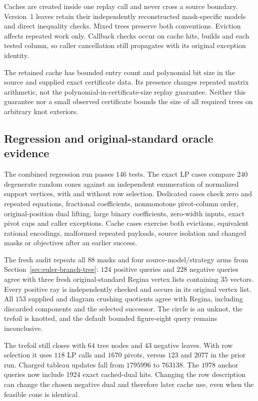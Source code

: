 Caches are created inside one replay call and never cross a source boundary.
Version~1 leaves retain their independently reconstructed mask-specific
models and direct inequality checks.  Mixed trees preserve both conventions.
Eviction affects repeated work only.  Callback checks occur on cache hits,
builds and each tested column, so caller cancellation still propagates with
its original exception identity.

The retained cache has bounded entry count and polynomial bit size in the
source and supplied exact certificate data.  Its presence changes repeated
matrix arithmetic, not the polynomial-in-certificate-size replay guarantee.
Neither this guarantee nor a small observed certificate bounds the size of
all required trees on arbitrary knot exteriors.

\subsection{Regression and original-standard oracle evidence}

The combined regression run passes $146$ tests.  The exact LP cases compare
$240$ degenerate random cones against an independent enumeration of normalized
support vertices, with and without row selection.  Dedicated cases check
zero and repeated equations, fractional coefficients, nonmonotone pivot-column
order, original-position dual lifting, large binary coefficients, zero-width
inputs, exact pivot caps and caller exceptions.  Cache cases exercise both
evictions, equivalent rational encodings, malformed repeated payloads,
source isolation and changed masks or objectives after an earlier success.

The fresh audit repeats all $88$ masks and four source-model/strategy arms
from Section~\ref{sec:euler-branch-tree}: $124$ positive queries and $228$
negative queries agree with three fresh original-standard Regina vertex
lists containing $35$ vectors.  Every positive ray is independently checked
and occurs in its original vertex list.  All $153$ supplied and diagram
crushing quotients agree with Regina, including discarded components and
the selected successor.  The circle is an unknot, the trefoil is knotted,
and the default bounded figure-eight query remains inconclusive.

The trefoil still closes with $64$ tree nodes and $43$ negative leaves.
With row selection it uses $118$ LP calls and $1670$ pivots, versus $123$
and $2077$ in the prior run.  Charged tableau updates fall from $1795996$
to $763138$.  The $1978$ anchor queries now include $1924$ exact cached-dual
hits.  Changing the row description can change the chosen negative dual and
therefore later cache use, even when the feasible cone is identical.

